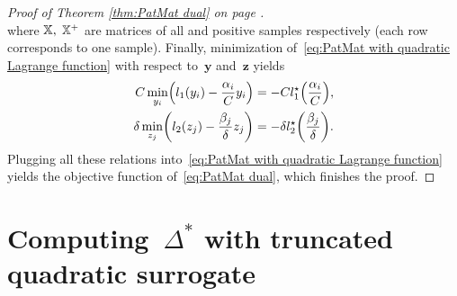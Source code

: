 \begin{proof}[Proof of Theorem \ref{thm:PatMat dual} on page \pageref{thm:PatMat dual}]
\begin{equation*}
  \end{equation*}
  where $\mathbb{X},$ $\mathbb{X}^+$ are matrices of all and positive samples respectively (each row corresponds to one sample). Finally, minimization of~\eqref{eq:PatMat with quadratic Lagrange function} with respect to~$\bm{y}$ and~$\bm{z}$ yields
  \begin{alignat*}{2}
      C \min_{y_i} \Brac{l_1(y_i) - \frac{\alpha_i}{C} y_i}
      & = - C l_1^{\star} \Brac{\frac{\alpha_i}{C}}, \\
      \delta \min_{z_j} \Brac{l_2(z_j) - \frac{\beta_j}{\delta} z_j}
      & = - \delta l_2^{\star} \Brac{\frac{\beta_j}{\delta}}.
  \end{alignat*}
  Plugging all these relations into~\eqref{eq:PatMat with quadratic Lagrange function} yields the objective function of~\eqref{eq:PatMat dual}, which finishes the proof.
\end{proof}

\section{Computing~$\Delta^{*}$ with truncated quadratic surrogate}\label{sec:Computing Delta with truncated quadratic surrogate}

\subsection{\TopPushK}

